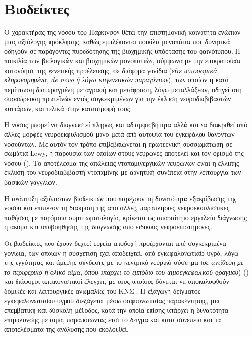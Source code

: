 \documentclass[12pt]{report}
\begin{document}
        \section{Βιοδείκτες}
        Ο χαρακτήρας της νόσου του Πάρκινσον θέτει την επιστημονική κοινότητα ενώπιον μιας αξιόλογης πρόκλησης, καθώς εμπλέκονται ποικίλα μονοπάτια που δυνητικά οδηγούν σε παράγοντες πυροδότησης της βιοχημικής υπόστασης του φαινότυπου. Η ποικιλία των βιολογικών και βιοχημικών μονοπατιών, σύμφωνα με την επικρατούσα κατανόηση της γενετικής προέλευσης, σε διάφορα γονίδια (\emph{είτε αυτοσωμικά κληρονομημένα, de novo ή λόγω επιγενετικών παραγόντων}), των οποίων η κατά περίπτωση διαταραγμένη μεταγραφή και μετάφραση, λόγω μεταλλάξεων, οδηγεί στη συσσώρευση πρωτεϊνών εντός συγκεκριμένων για την έκλυση νευροδιαβιβαστών κυττάρων, και τελικά στην καταστροφή 
        τους.
        \par
        Η νόσος μπορεί να διαγνωστεί πλήρως και αδιαμφισβήτητα αλλά και να διακριθεί από άλλες μορφές νευροεκφυλισμού μόνο μετά από αυτοψία του εγκεφάλου θανόντων νοσούντων. Με αυτόν τον τρόπο επιβεβαιώνεται η πρωτεονική συσσωμάτωση σε σωμάτια Lewy, η παρουσία των οποίων στους νευρώνες αποτελεί και τον ορισμό της νόσου (\emph{\cite{Miller2015BiomarkersFuture}}). Το αποτέλεσμα της απώλειας ντοπαμινεργικών νευρώνων είναι η ελλιπής έκλυση του νευροδιαβιβαστή ντοπαμίνης με αρνητική συνέπεια στην λειτουργία των βασικών γαγγλίων.
        \par
        Η ανάπτυξη αξιόπιστων βιοδεικτών που παρέχουν τη δυνατότητα εξακρίβωσης της νόσου και επιπλέον τη διάκριση της από άλλες, παραπλήσιες νευροεκφυλιστικές παθήσεις με παρόμοια συμπτωματολογία, κρίνεται ως απαραίτητο εργαλείο διάγνωσης ή ακόμα και υποβοήθησης της διάγνωσης από ειδικούς νευροεπιστήμονες.
        \par
        Οι βιοδείκτες που έχουν δεχτεί ευρεία αποδοχή προέρχονται από συγκεκριμένα γονίδια, των οποίων η συσχέτιση έχει αποδειχτεί, από εγκεφαλονωτιαίο υγρό, λόγω της εγγύτητας και άμεσης σύνδεσης με το κεντρικό νευρικό σύστημα (\emph{σε αντίθεση με το περιφερικό ή ολικό αίμα, όπου υπάρχει το εμπόδιο του αιμοεγκεφαλικού φραγμού}) (\emph{\cite{Miller2015BiomarkersFuture}}) και διάφοροι απεικονιστικοί έλεγχοι, με τους οποίους δύναται να αποκαλυφθούν δομικές και λειτουργικές ανωμαλίες του ΚΝΣ . Η εξαγωγή δείγματος εγκεφαλονωτιαίου υγρού διεξάγεται μέσω οσφυονωτιαίας παρακέντησης, μια επεμβατική και δύσκολη μέθοδος, κατά την οποία επίσης υπάρχει η δυνατότητα επιμόλυνσης με αίμα, παραποιώντας έτσι το δείγμα και κατά συνέπεια και τα αποτελέσματα της ανάλυσης που ακολουθεί.
\end{document}
